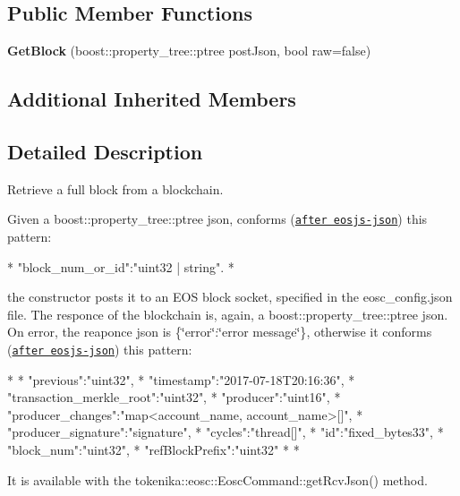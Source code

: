\subsection*{Public Member Functions}
\begin{DoxyCompactItemize}
\item 
\mbox{\label{classtokenika_1_1eosc_1_1_get_block_a67c1536e676f26b9e9dac915092f9627}} 
{\bfseries Get\+Block} (boost\+::property\+\_\+tree\+::ptree post\+Json, bool raw=false)
\end{DoxyCompactItemize}
\subsection*{Additional Inherited Members}


\subsection{Detailed Description}
Retrieve a full block from a blockchain. 

Given a {\ttfamily boost\+::property\+\_\+tree\+::ptree json}, conforms (\href{#https://github.com/EOSIO/eosjs-json/blob/master/api/v1/chain.json}{\tt after eosjs-\/json}) this pattern\+: \begin{DoxyVerb}* {"block_num_or_id":"uint32 | string"}.
* \end{DoxyVerb}


the constructor posts it to an E\+OS block socket, specified in the {\ttfamily eosc\+\_\+config.\+json} file. The responce of the blockchain is, again, a {\ttfamily boost\+::property\+\_\+tree\+::ptree json}. On error, the reaponce json is {\ttfamily \{\char`\"{}error\char`\"{}\+:\char`\"{}error message\char`\"{}\}}, otherwise it conforms (\href{#https://github.com/EOSIO/eosjs-json/blob/master/api/v1/chain.json}{\tt after eosjs-\/json}) this pattern\+: \begin{DoxyVerb}* {
* "previous":"uint32",
* "timestamp":"2017-07-18T20:16:36",
* "transaction_merkle_root":"uint32",
* "producer":"uint16",
* "producer_changes":"map<account_name, account_name>[]",
* "producer_signature":"signature",
* "cycles":"thread[]",
* "id":"fixed_bytes33",
* "block_num":"uint32",
* "refBlockPrefix":"uint32"
* }
* \end{DoxyVerb}


It is available with the tokenika\+::eosc\+::\+Eosc\+Command\+::get\+Rcv\+Json() method.

